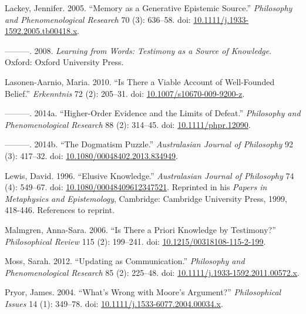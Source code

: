 \documentclass[
  11pt,
  letterpaper,
  DIV=11,
  numbers=noendperiod,
  twoside]{scrartcl}
\newlength{\cslhangindent}
\newenvironment{CSLReferences}[2] %
 {\begin{list}{}{%
  \setlength{\itemindent}{0pt}
  \setlength{\leftmargin}{0pt}
  \setlength{\parsep}{0pt}
  \ifodd #1
   \setlength{\leftmargin}{\cslhangindent}
   \setlength{\itemindent}{-1\cslhangindent}
  \fi
  \setlength{\itemsep}{#2\baselineskip}}}
 {\end{list}}
\begin{document}
\begin{CSLReferences}{1}{0}
Lackey, Jennifer. 2005. {``Memory as a Generative Epistemic Source.''}
\emph{Philosophy and Phenomenological Research} 70 (3): 636--58. doi:
\href{https://doi.org/10.1111/j.1933-1592.2005.tb00418.x}{10.1111/j.1933-1592.2005.tb00418.x}.

---------. 2008. \emph{Learning from Words: Testimony as a Source of
Knowledge}. Oxford: Oxford University Press.

Lasonen-Aarnio, Maria. 2010. {``Is There a Viable Account of
Well-Founded Belief.''} \emph{Erkenntnis} 72 (2): 205--31. doi:
\href{https://doi.org/10.1007/s10670-009-9200-z}{10.1007/s10670-009-9200-z}.

---------. 2014a. {``Higher-Order Evidence and the Limits of Defeat.''}
\emph{Philosophy and Phenomenological Research} 88 (2): 314--45. doi:
\href{https://doi.org/10.1111/phpr.12090}{10.1111/phpr.12090}.

---------. 2014b. {``The Dogmatism Puzzle.''} \emph{Australasian Journal
of Philosophy} 92 (3): 417--32. doi:
\href{https://doi.org/10.1080/00048402.2013.834949}{10.1080/00048402.2013.834949}.

Lewis, David. 1996. {``Elusive Knowledge.''} \emph{Australasian Journal
of Philosophy} 74 (4): 549--67. doi:
\href{https://doi.org/10.1080/00048409612347521}{10.1080/00048409612347521}.
Reprinted in his \emph{Papers in Metaphysics and Epistemology},
Cambridge: Cambridge University Press, 1999, 418-446. References to
reprint.

Malmgren, Anna-Sara. 2006. {``Is There a Priori Knowledge by
Testimony?''} \emph{Philosophical Review} 115 (2): 199--241. doi:
\href{https://doi.org/10.1215/00318108-115-2-199}{10.1215/00318108-115-2-199}.

Moss, Sarah. 2012. {``Updating as Communication.''} \emph{Philosophy and
Phenomenological Research} 85 (2): 225--48. doi:
\href{https://doi.org/10.1111/j.1933-1592.2011.00572.x}{10.1111/j.1933-1592.2011.00572.x}.

Pryor, James. 2004. {``What's Wrong with Moore's Argument?''}
\emph{Philosophical Issues} 14 (1): 349--78. doi:
\href{https://doi.org/10.1111/j.1533-6077.2004.00034.x}{10.1111/j.1533-6077.2004.00034.x}.


\end{CSLReferences}
\end{document}
